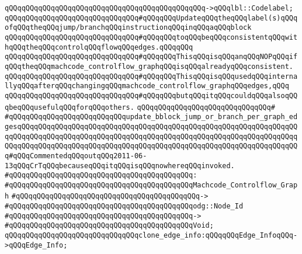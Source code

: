 \verb|qQQqqQQqqQQqqQQqqQQqqQQqqQQqqQQqqQQqqQQqqQQqqQQq->qQQqlbl::Codelabel;|\newline
\newline
\newline
\verb|qQQqqQQqqQQqqQQqqQQqqQQqqQQqqQQq#qQQqqQQqUpdateqQQqtheqQQqlabel(s)qQQqofqQQqtheqQQqjump/branchqQQqinstructionqQQqinqQQqaqQQqblock|\newline
\verb|qQQqqQQqqQQqqQQqqQQqqQQqqQQqqQQq#qQQqqQQqtoqQQqbeqQQqconsistentqQQqwithqQQqtheqQQqcontrolqQQqflowqQQqedges.qQQqqQQq|\newline
\verb|qQQqqQQqqQQqqQQqqQQqqQQqqQQqqQQq#qQQqqQQqThisqQQqisqQQqanqQQqNOPqQQqifqQQqtheqQQqmachcode_controlflow_graphqQQqisqQQqalreadyqQQqconsistent.|\newline
\verb|qQQqqQQqqQQqqQQqqQQqqQQqqQQqqQQq#qQQqqQQqThisqQQqisqQQqusedqQQqinternallyqQQqafterqQQqchangingqQQqmachcode_controlflow_graphqQQqedges,qQQq|\newline
\verb|qQQqqQQqqQQqqQQqqQQqqQQqqQQqqQQq#qQQqqQQqbutqQQqitqQQqcouldqQQqalsoqQQqbeqQQqusefulqQQqforqQQqothers.|\newline
\verb|qQQqqQQqqQQqqQQqqQQqqQQqqQQqqQQq#|\newline
\verb|#qQQqqQQqqQQqqQQqqQQqqQQqqQQqupdate_bblock_jump_or_branch_per_graph_edgesqQQqqQQqqQQqqQQqqQQqqQQqqQQqqQQqqQQqqQQqqQQqqQQqqQQqqQQqqQQqqQQqqQQqqQQqqQQqqQQqqQQqqQQqqQQqqQQqqQQqqQQqqQQqqQQqqQQqqQQqqQQqqQQqqQQqqQQqqQQqqQQqqQQqqQQqqQQqqQQqqQQqqQQqqQQqqQQqqQQqqQQqqQQqqQQqqQQqqQQqqQQqqQQq#qQQqCommentedqQQqoutqQQq2011-06-13qQQqCrTqQQqbecauseqQQqitqQQqisqQQqnowhereqQQqinvoked.|\newline
\verb|#qQQqqQQqqQQqqQQqqQQqqQQqqQQqqQQqqQQqqQQqqQQq:|\newline
\verb|#qQQqqQQqqQQqqQQqqQQqqQQqqQQqqQQqqQQqqQQqqQQqMachcode_Controlflow_Graph|\newline
\verb|#qQQqqQQqqQQqqQQqqQQqqQQqqQQqqQQqqQQqqQQqqQQq->|\newline
\verb|#qQQqqQQqqQQqqQQqqQQqqQQqqQQqqQQqqQQqqQQqqQQqodg::Node_Id|\newline
\verb|#qQQqqQQqqQQqqQQqqQQqqQQqqQQqqQQqqQQqqQQqqQQq->|\newline
\verb|#qQQqqQQqqQQqqQQqqQQqqQQqqQQqqQQqqQQqqQQqqQQqVoid;|\newline
\newline
\newline
\verb|qQQqqQQqqQQqqQQqqQQqqQQqqQQqqQQqclone_edge_info:qQQqqQQqEdge_InfoqQQq->qQQqEdge_Info;|\newline
\newline
\newline
